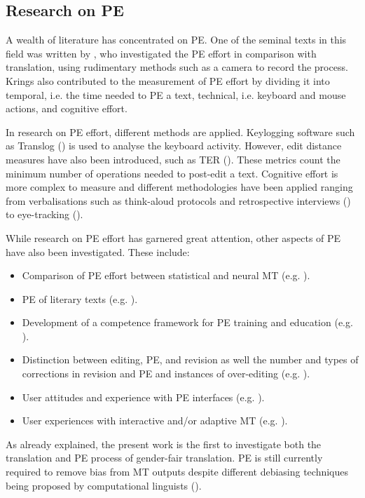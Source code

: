 \subsection{Research on PE}
A wealth of literature has concentrated on PE. One of the seminal texts in this field was written by \textcite{krings2001repairing}, who investigated the PE effort in comparison with translation, using rudimentary methods such as a camera to record the process. Krings also contributed to the measurement of PE effort by dividing it into temporal, i.e. the time needed to PE a text, technical, i.e. keyboard and mouse actions, and cognitive effort.

In research on PE effort, different methods are applied. Keylogging software such as Translog (\cite{jakobsen2017translation}) is used to analyse the keyboard activity. However, edit distance measures have also been introduced, such as TER (\cite{snover2006study}). These metrics count the minimum number of operations needed to post-edit a text. Cognitive effort is more complex to measure and different methodologies have been applied ranging from verbalisations such as think-aloud protocols and retrospective interviews (\cite{krings1986kopfen,ericsson1984protocol}) to eye-tracking (\cite{jakobsen2017translation,o2009eye}). 

While research on PE effort has garnered great attention, other aspects of PE have also been investigated. These include:
\begin{itemize}
\setlength\itemsep{-0.5em}
    \item Comparison of PE effort between statistical and neural MT (e.g. \cite{jia2019post}).
    \item PE of literary texts (e.g. \cite{moorkens2018translators}).
    \item Development of a competence framework for PE training and education (e.g. \cite{nitzke2019risk}).
    \item Distinction between editing, PE, and revision as well the number and types of corrections in revision and PE and instances of over-editing (e.g. \cite{koponen2020translation}).
    \item User attitudes and experience with PE interfaces (e.g. \cite{moorkens-obrien-2013-user}).
    \item User experiences with interactive and/or adaptive MT (e.g. \cite{daems2019pe}).
\end{itemize}
As already explained, the present work is the first to investigate both the translation and PE process of gender-fair translation. PE is still currently required to remove bias from MT outputs despite different debiasing techniques being proposed by computational linguists (\cite{savoldi2021gender}).


